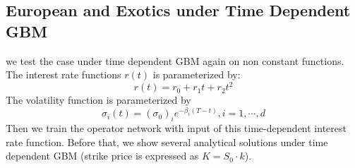 \documentclass[11pt,a4paper]{article}
\theoremstyle{remark}
\begin{document}
	\subsection{European and Exotics under Time Dependent GBM}
	we test the case under time dependent GBM again on non constant functions. The interest rate functions $r(t)$ is parameterized by:
	\begin{equation*}
		r(t) =r_0 + r_1 t + r_2 t^2
	\end{equation*}
	The volatility function is parameterized by 
	\begin{equation*}
		\sigma_i(t) = (\sigma_0)_i e^{-\beta_i (T - t)}, i=1,\cdots,d
	\end{equation*}
	Then we train the operator network with input of this time-dependent interest rate function. Before that, we show several analytical solutions under time dependent GBM (strike price is expressed as $K =S_0 \cdot k$).
	
\end{document}
